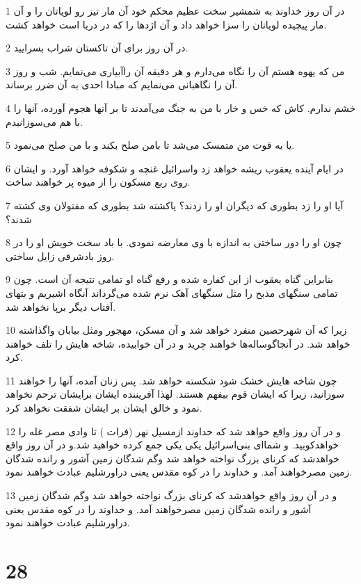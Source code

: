 \par 1 در آن روز خداوند به شمشیر سخت عظیم محکم خود آن مار تیز رو لویاتان را و آن مار پیچیده لویاتان را سزا خواهد داد و آن اژدها را که در دریا است خواهد کشت.
\par 2 در آن روز برای آن تاکستان شراب بسرایید.
\par 3 من که یهوه هستم آن را نگاه می‌دارم و هر دقیقه آن راآبیاری می‌نمایم. شب و روز آن را نگاهبانی می‌نمایم که مبادا احدی به آن ضرر برساند.
\par 4 خشم ندارم. کاش که خس و خار با من به جنگ می‌آمدند تا بر آنها هجوم آورده، آنها را با هم می‌سوزانیدم.
\par 5 یا به قوت من متمسک می‌شد تا بامن صلح بکند و با من صلح می‌نمود.
\par 6 در ایام آینده یعقوب ریشه خواهد زد واسرائیل غنچه و شکوفه خواهد آورد. و ایشان روی ربع مسکون را از میوه پر خواهند ساخت.
\par 7 آیا او را زد بطوری که دیگران او را زدند؟ یاکشته شد بطوری که مقتولان وی کشته شدند؟
\par 8 چون او را دور ساختی به اندازه با وی معارضه نمودی. با باد سخت خویش او را در روز بادشرقی زایل ساختی.
\par 9 بنابراین گناه یعقوب از این کفاره شده و رفع گناه او تمامی نتیجه آن است. چون تمامی سنگهای مذبح را مثل سنگهای آهک نرم شده می‌گرداند آنگاه اشیریم و بتهای آفتاب دیگر برپا نخواهد شد.
\par 10 زیرا که آن شهرحصین منفرد خواهد شد و آن مسکن، مهجور ومثل بیابان واگذاشته خواهد شد. در آنجاگوساله‌ها خواهند چرید و در آن خوابیده، شاخه هایش را تلف خواهند کرد.
\par 11 چون شاخه هایش خشک شود شکسته خواهد شد. پس زنان آمده، آنها را خواهند سوزانید، زیرا که ایشان قوم بیفهم هستند. لهذا آفریننده ایشان برایشان ترحم نخواهد نمود و خالق ایشان بر ایشان شفقت نخواهد کرد.
\par 12 و در آن روز واقع خواهد شد که خداوند ازمسیل نهر (فرات ) تا وادی مصر غله را خواهدکوبید. و شما‌ای بنی‌اسرائیل یکی یکی جمع کرده خواهید شد.و در آن روز واقع خواهدشد که کرنای بزرگ نواخته خواهد شد وگم شدگان زمین آشور و رانده شدگان زمین مصرخواهند آمد. و خداوند را در کوه مقدس یعنی دراورشلیم عبادت خواهند نمود.
\par 13 و در آن روز واقع خواهدشد که کرنای بزرگ نواخته خواهد شد وگم شدگان زمین آشور و رانده شدگان زمین مصرخواهند آمد. و خداوند را در کوه مقدس یعنی دراورشلیم عبادت خواهند نمود.
 
\chapter{28}


